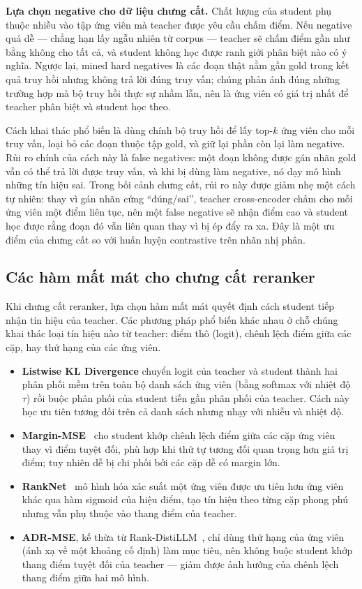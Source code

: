 \documentclass[../DoAn.tex]{subfiles}
\begin{document}
\noindent\textbf{Lựa chọn negative cho dữ liệu chưng cất.} Chất lượng của student phụ thuộc nhiều vào tập ứng viên mà teacher được yêu cầu chấm điểm. Nếu negative quá dễ --- chẳng hạn lấy ngẫu nhiên từ corpus --- teacher sẽ chấm điểm gần như bằng không cho tất cả, và student không học được ranh giới phân biệt nào có ý nghĩa. Ngược lại, mined hard negatives là các đoạn thật nằm gần gold trong kết quả truy hồi nhưng không trả lời đúng truy vấn; chúng phản ánh đúng những trường hợp mà bộ truy hồi thực sự nhầm lẫn, nên là ứng viên có giá trị nhất để teacher phân biệt và student học theo.

Cách khai thác phổ biến là dùng chính bộ truy hồi để lấy top-$k$ ứng viên cho mỗi truy vấn, loại bỏ các đoạn thuộc tập gold, và giữ lại phần còn lại làm negative. Rủi ro chính của cách này là false negatives: một đoạn không được gán nhãn gold vẫn có thể trả lời được truy vấn, và khi bị dùng làm negative, nó dạy mô hình những tín hiệu sai. Trong bối cảnh chưng cất, rủi ro này được giảm nhẹ một cách tự nhiên: thay vì gán nhãn cứng ``đúng/sai'', teacher cross-encoder chấm cho mỗi ứng viên một điểm liên tục, nên một false negative sẽ nhận điểm cao và student học được rằng đoạn đó vẫn liên quan thay vì bị ép đẩy ra xa. Đây là một ưu điểm của chưng cất so với huấn luyện contrastive trên nhãn nhị phân.

\subsection{Các hàm mất mát cho chưng cất reranker}
\label{subsection:2.3.4}

Khi chưng cất reranker, lựa chọn hàm mất mát quyết định cách student tiếp nhận tín hiệu của teacher. Các phương pháp phổ biến khác nhau ở chỗ chúng khai thác loại tín hiệu nào từ teacher: điểm thô (logit), chênh lệch điểm giữa các cặp, hay thứ hạng của các ứng viên.

\begin{itemize}
    \item \textbf{Listwise KL Divergence} chuyển logit của teacher và student thành hai phân phối mềm trên toàn bộ danh sách ứng viên (bằng softmax với nhiệt độ $\tau$) rồi buộc phân phối của student tiến gần phân phối của teacher. Cách này học ưu tiên tương đối trên cả danh sách nhưng nhạy với nhiễu và nhiệt độ.
    \item \textbf{Margin-MSE}~\cite{hofstatter2020marginmse} cho student khớp chênh lệch điểm giữa các cặp ứng viên thay vì điểm tuyệt đối, phù hợp khi thứ tự tương đối quan trọng hơn giá trị điểm; tuy nhiên dễ bị chi phối bởi các cặp dễ có margin lớn.
    \item \textbf{RankNet}~\cite{burges2005ranknet} mô hình hóa xác suất một ứng viên được ưu tiên hơn ứng viên khác qua hàm sigmoid của hiệu điểm, tạo tín hiệu theo từng cặp phong phú nhưng vẫn phụ thuộc vào thang điểm của teacher.
    \item \textbf{ADR-MSE}, kế thừa từ Rank-DistiLLM~\cite{schlatt2025rankdistillm}, chỉ dùng thứ hạng của ứng viên (ánh xạ về một khoảng cố định) làm mục tiêu, nên không buộc student khớp thang điểm tuyệt đối của teacher --- giảm được ảnh hưởng của chênh lệch thang điểm giữa hai mô hình.
\end{itemize}
\end{document}
